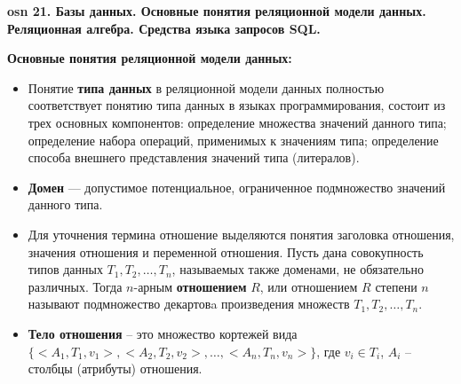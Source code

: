 \textbf{\LARGE osn 21. Базы данных. Основные понятия реляционной модели данных. Реляционная алгебра. Средства языка запросов SQL.}


\textbf{Основные понятия реляционной модели данных:}

\begin{itemize}
    \item Понятие \textbf{типа данных} в реляционной модели данных полностью соответствует понятию типа данных в языках программирования, состоит из трех основных компонентов: определение множества значений данного типа; определение набора операций, применимых к значениям типа; определение способа внешнего представления значений типа (литералов).
    \item \textbf{Домен} --- допустимое потенциальное, ограниченное подмножество значений данного типа.
    \item Для уточнения термина отношение выделяются понятия заголовка отношения, значения отношения и переменной отношения.
    Пусть дана совокупность типов данных $T_1, T_2, \dots, T_n$, называемых также доменами, не обязательно различных. Тогда $n$-арным \textbf{отношением} $R$, или отношением $R$ степени $n$ называют подмножество декартовa произведения множеств $T_1, T_2, \dots, T_n$.
    \item \textbf{Тело отношения} -- это множество кортежей вида $\{<A_1, T_1, v_1>, < A_2, T_2, v_2 >,\dots, < A_n, T_n, v_n>\}$, где $v_i \in T_i$, $A_i$ -- столбцы (атрибуты) отношения. 

\end{itemize}

